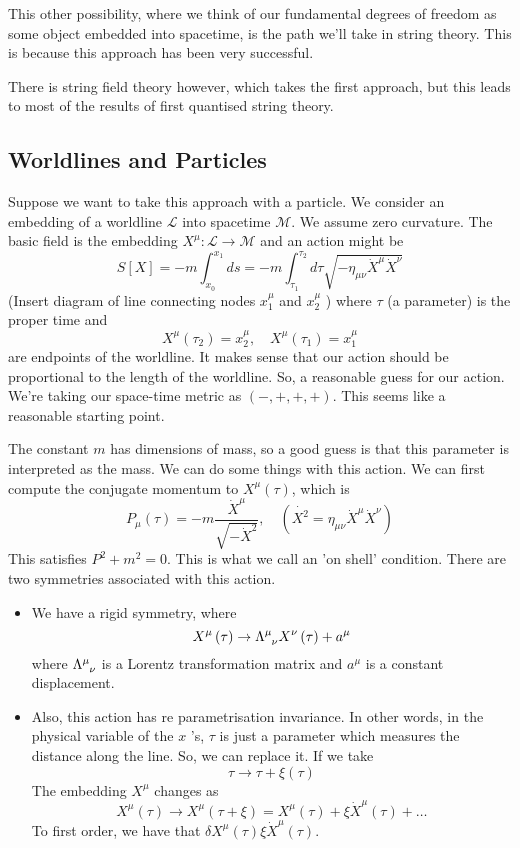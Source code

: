 \documentclass[11pt, oneside]{article}   	%
\theoremstyle{slanted}
\begin{document}
This other possibility, 
where we think of our fundamental degrees of 
freedom as some object embedded into spacetime, 
is the path we'll take in string theory. 
This is because this approach has been very successful. 

There is string field theory however, which takes the first 
approach, but this leads to most of the results 
of first quantised string theory. 

\subsection{Worldlines and Particles}
Suppose we want to take this approach 
with a particle. 
We consider an embedding 
of a worldline $ \mathcal{ L } $ 
into spacetime $ \mathcal{ M } $. 
We assume zero curvature. 
The basic field is the embedding $ X ^ \mu : 
\mathcal{ L } \to \mathcal{ M } $ 
and an action might be 
\[
S \left[  X  \right]   =  -m \int _{ x_0 } ^{ x_1 } ds  =  -m 
\int_{ \tau_1 }^{ \tau_2 } d \tau \sqrt{  - \eta _{ \mu \nu } \dot{ X  }^ \mu \dot{  X} ^ \nu   } 
\] (Insert diagram of line connecting nodes $ x_ 1 ^ \mu $ and $ x _ 2 ^ \mu $  )
where $ \tau $ (a parameter) is the proper time 
and 
\[
X ^ \mu \left( \tau _ 2  \right)   =  x _ 2 ^ \mu , \quad X ^ \mu \left( \tau _ 1  \right)   = x_1 ^ \mu  
\] are endpoints of the worldline. 
It makes sense 
that our action 
should be proportional to 
the length of the worldline. 
So, a reasonable guess for our action. 
We're taking our space-time metric as $ \left(  -, + , + , +  \right)  $. 
This seems like a reasonable starting point. 

The constant $ m $ has dimensions of mass, 
so a good guess is that this parameter 
is interpreted as the mass. 
We can do some things with this action. 
We can first compute the 
conjugate momentum
to $ X ^ \mu \left( \tau  \right)  $, which is 
\[
P _ \mu \left(\tau   \right)   =  - m \frac{ \dot{ X  }^ \mu   }{ 
\sqrt{  - \dot{ X} ^ 2   }  } , \quad \left( \dot{ X ^ 2 }  = \eta_{ \mu \nu } 
\dot{X } ^ \mu \dot{ X } ^ \nu   \right) 
\] This satisfies $ P ^ 2 + m ^ 2  =  0 $. 
This is what we call an 'on shell' condition. 
There are two symmetries 
associated with this action. 
\begin{itemize}
\item  We have a rigid symmetry, where 
	\[
	 X ^ \mu \left( \tau  \right)  \to \Lambda \indices{ ^ \mu _ \nu } 
	 X^ \nu \left( \tau  \right)  +  a ^ \mu 
 \] where $ \Lambda \indices{ ^ \mu _ \nu }  $ is a Lorentz transformation 
 matrix and $ a ^ \mu $ is a constant displacement. 
\item Also, this action has 
 re parametrisation invariance. In other words, 
 in the physical variable of the $ x $ 's, $ \tau $ is 
 just a parameter which measures the distance along the line. 
 So, we can replace it. 
 If we take 
 \[
	 \tau \to \tau + \xi \left( \tau  \right)  
 \] The embedding $ X ^ \mu $ changes as 
 \[
  X ^ \mu \left( \tau  \right)  \to 
  X ^ \mu \left( \tau + \xi  \right)   = X ^ \mu \left( \tau  \right)  
  + \xi \dot{ X } ^ \mu \left( \tau  \right)  + \dots  
\] To first order, we have that $ \delta X ^ \mu \left( \tau  \right)  
\xi \dot{ X } ^ \mu \left( \tau  \right)   $. 
\end{itemize} 
\end{document}
